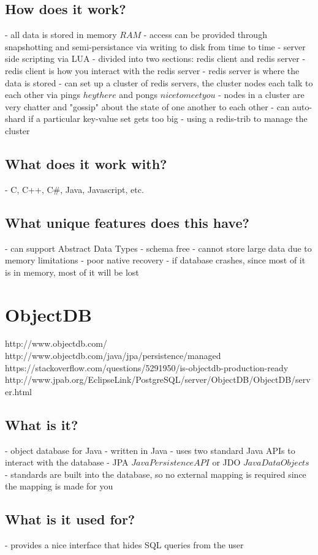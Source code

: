 \section{How does it work?}
- all data is stored in memory \(RAM\)
- access can be provided through snapshotting and semi-persistance via writing to disk from time to time
- server side scripting via LUA
- divided into two sections: redis client and redis server
- redis client is how you interact with the redis server
- redis server is where the data is stored
- can set up a cluster of redis servers, the cluster nodes each talk to each other via pings \(hey there\) and pongs \(nice to meet you\)
- nodes in a cluster are very chatter and "gossip" about the state of one another to each other
- can auto-shard if a particular key-value set gets too big
- using a redis-trib to manage the cluster

\section{What does it work with?}
- C, C++, C#, Java, Javascript, etc.

\section{What unique features does this have?}
- can support Abstract Data Types
- schema free
- cannot store large data due to memory limitations
- poor native recovery - if database crashes, since most of it is in memory, most of it will be lost

\chapter{ObjectDB}
http://www.objectdb.com/
http://www.objectdb.com/java/jpa/persistence/managed
https://stackoverflow.com/questions/5291950/is-objectdb-production-ready
http://www.jpab.org/EclipseLink/PostgreSQL/server/ObjectDB/ObjectDB/server.html

\section{What is it?}
- object database for Java
- written in Java
- uses two standard Java APIs to interact with the database - JPA \(Java Persistence API\) or JDO \(Java Data Objects\)
- standards are built into the database, so no external mapping is required since the mapping is made for you

\section{What is it used for?}
- provides a nice interface that hides SQL queries from the user

